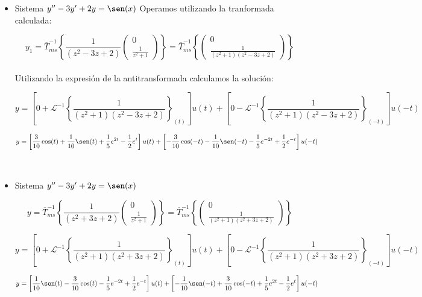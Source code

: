 \documentclass[12pt]{article}
\begin{document}
\begin{itemize}
\item Sistema  $y'' - 3 y' +2y=\sen(x)$
Operamos utilizando la tranformada calculada:

$$
y_1 =\overline{T}_{ms}^{-1}\left\{ \frac{1}{\left( z^2 - 3z + 2\right) }  \begin{pmatrix}
0\\[0.3cm]
\frac{1}{z^2+1}
\end{pmatrix}\right\} = \overline{T}_{ms}^{-1}\left\{   \begin{pmatrix}
0\\[0.3cm]
\frac{1}{(z^2+1)( z^2 - 3z + 2)}
\end{pmatrix}\right\} 
$$\\

Utilizando la expresión de la antitransformada calculamos la solución:
{\footnotesize
$$
y=\left[ 0 + \mathcal{L}^{-1}\left\{\frac{1}{(z^2+1)( z^2 - 3z + 2)}\right\}_{(t)}\right]  u(t) +  \left[  0 - \mathcal{L}^{-1}\left\{\frac{1}{(z^2+1)( z^2 - 3z + 2)}\right\}_{(-t)} \right] u(-t)
$$

$$y= \left[\frac{3}{10}\cos(t)+\frac{1}{10}\sen(t)+\frac{1}{5} e^{2t}-\frac{1}{2} e^t\right] u(t)+ \left[- \frac{3}{10} \cos(-t)-\frac{1}{10}\sen(-t) -\frac{1}{5} e^{-2t} + \frac{1}{2} e^{-t}\right] u(-t)$$
}\\

\item Sistema  $y'' - 3 y' +2y=\sen(x)$

$$
y=\overline{T}_{ms}^{-1}\left\{ \frac{1}{\left( z^2 + 3z + 2\right) }  \begin{pmatrix}
0\\[0.3cm]
\frac{1}{z^2+1}
\end{pmatrix}\right\} = \overline{T}_{ms}^{-1}\left\{   \begin{pmatrix}
0\\[0.3cm]
\frac{1}{(z^2+1)( z^2 + 3z + 2)}
\end{pmatrix}\right\} 
$$

{\footnotesize
$$
y =\left[ 0 + \mathcal{L}^{-1}\left\{\frac{1}{(z^2+1)( z^2 + 3z + 2)}\right\}_{(t)}\right]  u(t) +  \left[  0 - \mathcal{L}^{-1}\left\{\frac{1}{(z^2+1)( z^2 + 3z + 2)}\right\}_{(-t)} \right] u(-t)
$$


$$y= \left[\frac{1}{10}\sen(t)-\frac{3}{10}\cos(t)-\frac{1}{5} e^{-2t}+\frac{1}{2} e^{-t}\right] u(t)+ \left[-\frac{1}{10}\sen(-t)+\frac{3}{10}\cos(-t)+\frac{1}{5} e^{2t}-\frac{1}{2} e^{t}\right]u(-t)$$
}\\

\end{itemize}
\end{document}
